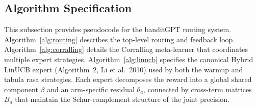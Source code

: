 
\subsection{Algorithm Specification}
\label{appendix:algorithm}

This subsection provides pseudocode for the banditGPT routing system.
Algorithm~\ref{alg:routing} describes the top-level routing and feedback loop.
Algorithm~\ref{alg:corralling} details the Corralling meta-learner that
coordinates multiple expert strategies.
Algorithm~\ref{alg:linucb} specifies the canonical Hybrid LinUCB expert
(Algorithm~2, Li et al.\ 2010) used by both the warmup and tabula rasa
strategies.  Each expert decomposes the reward into a global shared component
$\beta$ and an arm-specific residual $\theta_a$, connected by cross-term
matrices $B_a$ that maintain the Schur-complement structure of the joint
precision.


